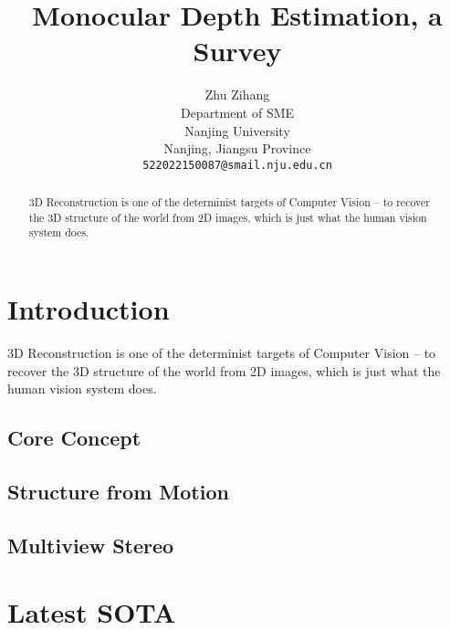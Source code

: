 \documentclass{arxiv_art/arxiv_art}
\title{Monocular Depth Estimation, a Survey}
\author{
    \hspace{1mm}Zhu Zihang \\
    Department of SME \\
    Nanjing University\\
    Nanjing, Jiangsu Province \\
    \texttt{522022150087@smail.nju.edu.cn}
}
\begin{document}
\maketitle 
\begin{abstract}
    3D Reconstruction is one of the determinist targets 
    of Computer Vision -- to recover the 3D structure of
    the world from 2D images, which is just what the human 
    vision system does. 
\end{abstract}


\section{Introduction}

3D Reconstruction is one of the determinist targets 
of Computer Vision -- to recover the 3D structure of
the world from 2D images, which is just what the human 
vision system does. 

\subsection{Core Concept}

\subsection{Structure from Motion}

\subsection{Multiview Stereo}


\section{Latest SOTA}

\lipsum[3]


\end{document}
